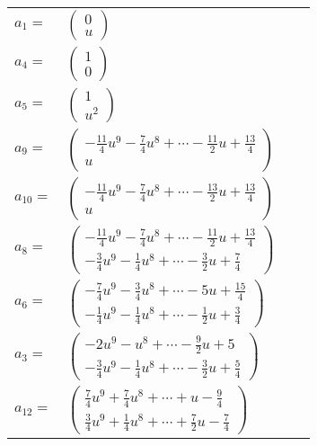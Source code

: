 \documentclass[1p]{elsarticle_modified}
\theoremstyle{definition}
\begin{document}
\begin{tabular}{m{7pt} m{180pt} m{7pt} m{180pt} }
\flushright $a_{1}=$&$\begin{pmatrix}0\\u\end{pmatrix}$ \\
\flushright $a_{4}=$&$\begin{pmatrix}1\\0\end{pmatrix}$ \\
\flushright $a_{5}=$&$\begin{pmatrix}1\\u^2\end{pmatrix}$ \\
\flushright $a_{9}=$&$\begin{pmatrix}-\frac{11}{4} u^9-\frac{7}{4} u^8+\cdots-\frac{11}{2} u+\frac{13}{4}\\u\end{pmatrix}$ \\
\flushright $a_{10}=$&$\begin{pmatrix}-\frac{11}{4} u^9-\frac{7}{4} u^8+\cdots-\frac{13}{2} u+\frac{13}{4}\\u\end{pmatrix}$ \\
\flushright $a_{8}=$&$\begin{pmatrix}-\frac{11}{4} u^9-\frac{7}{4} u^8+\cdots-\frac{11}{2} u+\frac{13}{4}\\-\frac{3}{4} u^9-\frac{1}{4} u^8+\cdots-\frac{3}{2} u+\frac{7}{4}\end{pmatrix}$ \\
\flushright $a_{6}=$&$\begin{pmatrix}-\frac{7}{4} u^9-\frac{3}{4} u^8+\cdots-5 u+\frac{15}{4}\\-\frac{1}{4} u^9-\frac{1}{4} u^8+\cdots-\frac{1}{2} u+\frac{3}{4}\end{pmatrix}$ \\
\flushright $a_{3}=$&$\begin{pmatrix}-2 u^9- u^8+\cdots-\frac{9}{2} u+5\\-\frac{3}{4} u^9-\frac{1}{4} u^8+\cdots-\frac{3}{2} u+\frac{5}{4}\end{pmatrix}$ \\
\flushright $a_{12}=$&$\begin{pmatrix}\frac{7}{4} u^9+\frac{7}{4} u^8+\cdots+u-\frac{9}{4}\\\frac{3}{4} u^9+\frac{1}{4} u^8+\cdots+\frac{7}{2} u-\frac{7}{4}\end{pmatrix}$ \\

\end{tabular}
\end{document}
